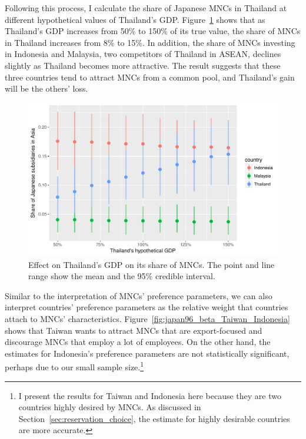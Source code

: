 Following this process, I calculate the share of Japanese MNCs in Thailand at
different hypothetical values of Thailand's GDP.
Figure~\ref{fig:japan96_effect_GDP_on_share_of_MNCs} shows that as Thailand's
GDP increases from 50\% to 150\% of its true value, the share of MNCs in
Thailand increases from 8\% to 15\%. In addition, the share of MNCs investing in
Indonesia and Malaysia, two competitors of Thailand in ASEAN, declines slightly
as Thailand becomes more attractive. The result suggests that these three
countries tend to attract MNCs from a common pool, and Thailand's gain will be
the others' loss.

\begin{figure}[tbp]
  \centering
  \includegraphics[width=\textwidth,keepaspectratio]{../figure/japan96_effect_GDP_on_share_of_MNCs}
  \caption[Effect of Thailand's GDP on its share of MNCs.]{Effect on Thailand's
    GDP on its share of MNCs. The point and line range show the mean and the
    95\% credible interval.}
  \label{fig:japan96_effect_GDP_on_share_of_MNCs}
\end{figure}

Similar to the interpretation of MNCs' preference parameters, we can also
interpret countries' preference parameters as the relative weight that countries
attach to MNCs' characteristics. Figure~\ref{fig:japan96_beta_Taiwan_Indonesia}
shows that Taiwan wants to attract MNCs that are export-focused and discourage
MNCs that employ a lot of employees. On the other hand, the estimates for
Indonesia's preference parameters are not statistically significant, perhaps due
to our small sample size.\footnote{I present the results for Taiwan and
  Indonesia here because they are two countries highly desired by MNCs. As
  discussed in Section~\ref{sec:reservation_choice}, the estimate for highly
  desirable countries are more accurate.}

